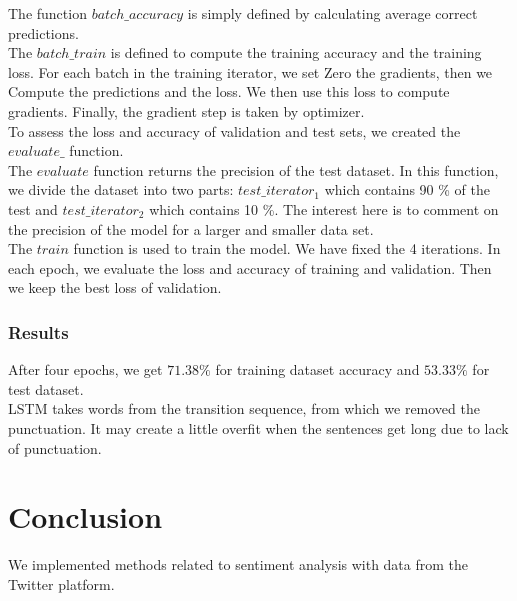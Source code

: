 \documentclass{article}
\begin{document}
The function $batch\_accuracy$ is simply defined by calculating average correct predictions.\\

The $batch\_train$ is defined to compute the training accuracy and the training loss.  For each batch in the training iterator, we set Zero the gradients, then we Compute the predictions and the loss. We then use this loss to compute gradients. Finally, the gradient step is taken by optimizer. \\

To assess the loss and accuracy of validation and test sets, we created the $ evaluate\_ $ function.\\

The $ evaluate $ function returns the precision of the test dataset. In this function, we divide the dataset into two parts: $ test\_iterator_1 $ which contains 90 \% of the test and $ test\_iterator_2 $ which contains 10 \%. The interest here is to comment on the precision of the model for a larger and smaller data set.\\

The $ train $ function is used to train the model. We have fixed the 4 iterations. In each epoch, we evaluate the loss and accuracy of training and validation. Then we keep the best loss of validation.\\

\subsubsection{Results}

After four epochs, we get $ 71.38 \% $ for training dataset accuracy and  $53.33\%$ for test dataset.\\

LSTM takes words from the transition sequence, from which we removed the punctuation. It may create a little overfit when the sentences get long due to lack of punctuation.

\section*{Conclusion}

We implemented methods related to sentiment analysis with data from the Twitter platform.

\printglossaries
\printbibliography
\end{document}
